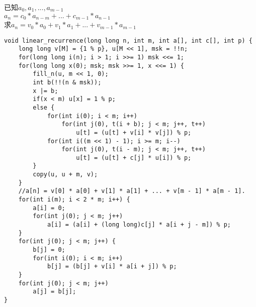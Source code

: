 已知$a_0, a_1, ..., a_{m - 1}$\\
	$a_n = c_0 * a_{n - m} + ... + c_{m - 1} * a_{n - 1}$\\
	求$a_n = v_0 * a_0 + v_1 * a_1 + ... + v_{m - 1} * a_{m - 1}$\\
\begin{lstlisting}
void linear_recurrence(long long n, int m, int a[], int c[], int p) {
	long long v[M] = {1 % p}, u[M << 1], msk = !!n;
	for(long long i(n); i > 1; i >>= 1) msk <<= 1;
	for(long long x(0); msk; msk >>= 1, x <<= 1) {
		fill_n(u, m << 1, 0);
		int b(!!(n & msk));
		x |= b;
		if(x < m) u[x] = 1 % p;
		else {
			for(int i(0); i < m; i++)
				for(int j(0), t(i + b); j < m; j++, t++)
					u[t] = (u[t] + v[i] * v[j]) % p;
			for(int i((m << 1) - 1); i >= m; i--)
				for(int j(0), t(i - m); j < m; j++, t++)
					u[t] = (u[t] + c[j] * u[i]) % p;
		}
		copy(u, u + m, v);
	}
	//a[n] = v[0] * a[0] + v[1] * a[1] + ... + v[m - 1] * a[m - 1].
	for(int i(m); i < 2 * m; i++) {
		a[i] = 0;
		for(int j(0); j < m; j++)
			a[i] = (a[i] + (long long)c[j] * a[i + j - m]) % p;
	}
	for(int j(0); j < m; j++) {
		b[j] = 0;
		for(int i(0); i < m; i++)
			b[j] = (b[j] + v[i] * a[i + j]) % p;
	}
	for(int j(0); j < m; j++)
		a[j] = b[j];
}
\end{lstlisting}
